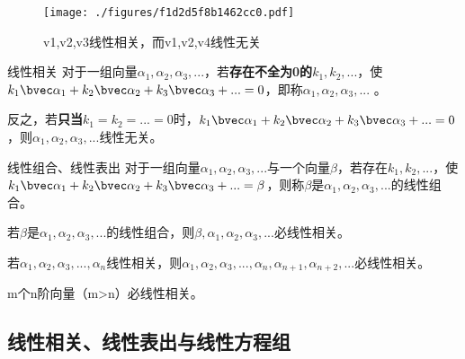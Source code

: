 

\begin{issues}
\issueDraft
{}
\end{issues}


\begin{figure}[ht]
\centering
\texttt{[image: ./figures/f1d2d5f8b1462cc0.pdf]}
\caption{v1,v2,v3线性相关，而v1,v2,v4线性无关} \label{fig_LnDpd2_1}
\end{figure}

\begin{definition}{线性相关}
对于一组向量$\alpha_1, \alpha_2,\alpha_3,...$，若\textbf{存在不全为0的}$k_1,k_2,...$，使$k_1 \bvec \alpha_1+k_2 \bvec \alpha_2+k_3 \bvec \alpha_3+...=0$，即称$\alpha_1, \alpha_2,\alpha_3,...$ 。

反之，若\textbf{只当}$k_1=k_2=...=0$时，$k_1 \bvec \alpha_1+k_2 \bvec \alpha_2+k_3 \bvec \alpha_3+...=0$，则$\alpha_1, \alpha_2,\alpha_3,...$线性无关。
\end{definition}

\begin{definition}{线性组合、线性表出}
对于一组向量$\alpha_1, \alpha_2,\alpha_3,...$与一个向量$\beta$，若存在$k_1,k_2,...$，使$k_1 \bvec \alpha_1+k_2 \bvec \alpha_2+k_3 \bvec \alpha_3+...=\beta$，则称$\beta$是$\alpha_1, \alpha_2,\alpha_3,...$的线性组合。
\end{definition}

\begin{theorem}{}
若$\beta$是$\alpha_1, \alpha_2,\alpha_3,...$的线性组合，则$\beta, \alpha_1, \alpha_2,\alpha_3,...$必线性相关。
\end{theorem}

\begin{theorem}{}
若$\alpha_1, \alpha_2,\alpha_3,...,\alpha_n$线性相关，则$\alpha_1, \alpha_2,\alpha_3,...,\alpha_n,\alpha_{n+1},\alpha_{n+2},...$必线性相关。
\end{theorem}

\begin{theorem}{}
m个n阶向量（m>n）必线性相关。
\end{theorem}

\subsection{线性相关、线性表出与线性方程组}

